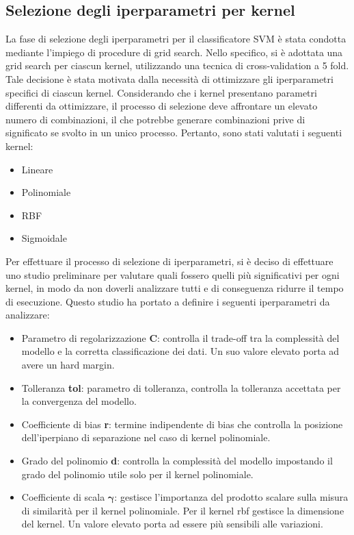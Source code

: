 \subsection{Selezione degli iperparametri per kernel}
La fase di selezione degli iperparametri per il classificatore SVM è stata
condotta mediante l'impiego di procedure di grid search. Nello specifico, si è
adottata una grid search per ciascun kernel, utilizzando una tecnica di
cross-validation a 5 fold. Tale decisione è stata motivata dalla necessità di
ottimizzare gli iperparametri specifici di ciascun kernel. Considerando che i
kernel presentano parametri differenti da ottimizzare, il processo di selezione
deve affrontare un elevato numero di combinazioni, il che potrebbe generare
combinazioni prive di significato se svolto in un unico processo. Pertanto, sono
stati valutati i seguenti kernel:
\begin{itemize}
    \item Lineare
    \item Polinomiale
    \item RBF
    \item Sigmoidale
\end{itemize}

Per effettuare il processo di selezione di iperparametri, si è deciso di
effettuare uno studio preliminare per valutare quali fossero quelli più
significativi per ogni kernel, in modo da non doverli analizzare tutti e di
conseguenza ridurre il tempo di esecuzione. Questo studio ha portato a definire
i seguenti iperparametri da analizzare:
\begin{itemize}
    \item Parametro di regolarizzazione \textbf{C}: controlla il trade-off tra
          la complessità del modello e la corretta classificazione dei dati.
          Un suo valore elevato porta ad avere un hard margin.
    \item Tolleranza \textbf{tol}: parametro di tolleranza, controlla la
          tolleranza accettata per la convergenza del modello.
    \item Coefficiente di bias \textbf{r}: termine indipendente di bias che
          controlla la posizione dell'iperpiano di separazione nel caso di
          kernel polinomiale.
    \item Grado del polinomio \textbf{d}: controlla la complessità del modello
          impostando il grado del polinomio utile solo per il kernel polinomiale.
    \item Coefficiente di scala $\boldsymbol{\gamma}$: gestisce l'importanza del
          prodotto scalare sulla misura di similarità per il kernel polinomiale.
          Per il kernel rbf gestisce la dimensione del kernel. Un valore elevato
          porta ad essere più sensibili alle variazioni.
\end{itemize}

